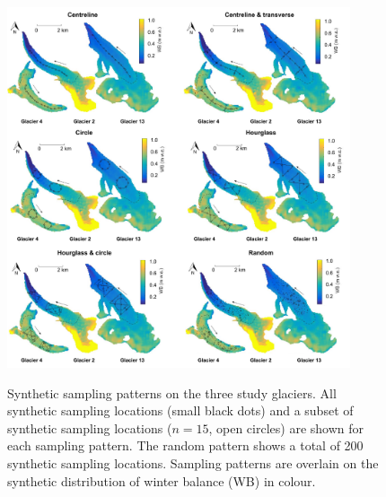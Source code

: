 \documentclass{article}
\begin{document}

\begin{figure}
	\centering
	\includegraphics[width =0.9\textwidth]{Pulwicki_Fig2.pdf}\\
	\caption{Synthetic sampling patterns on the three study glaciers. All synthetic sampling locations (small black dots) and a subset of synthetic sampling locations ($n=15$, open circles) are shown for each sampling pattern. The random pattern shows a total of 200 synthetic sampling locations. Sampling patterns are overlain on the synthetic distribution of winter balance (WB) in colour. } 
       \label{fig:SyntheticSampleDesign}
\end{figure}
\end{document}

